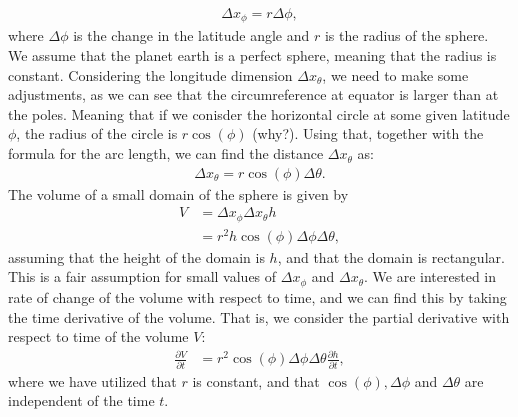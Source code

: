 \begin{align*}
    \Delta x_{\phi} = r \Delta \phi,
\end{align*}
where $\Delta \phi$ is the change in the latitude angle and $r$ is the radius of the sphere.
We assume that the planet earth is a perfect sphere, meaning that the radius is constant.
Considering the longitude dimension $\Delta x_{\theta}$, we need to make some adjustments, as we can see that the circumreference at equator is larger than at the poles.
Meaning that if we conisder the horizontal circle at some given latitude $\phi$, the radius of the circle is $r \cos(\phi)$ (why?).
Using that, together with the formula for the arc length, we can find the distance $\Delta x_{\theta}$ as:
\begin{align*}
    \Delta x_{\theta} = r \cos(\phi) \Delta \theta.
\end{align*}
The volume of a small domain of the sphere is given by 
\begin{align*}
    V &= \Delta x_{\phi} \Delta x_{\theta} h \\
    &= r^2 h \cos(\phi) \Delta \phi \Delta \theta,
\end{align*}
assuming that the height of the domain is $h$, and that the domain is rectangular.
This is a fair assumption for small values of $\Delta x_{\phi}$ and $\Delta x_{\theta}$.
We are interested in rate of change of the volume with respect to time, and we can find this by taking the time derivative of the volume.
That is, we consider the partial derivative with respect to time of the volume $V$:
\begin{align*}
    \frac{\partial V}{\partial t} &= r^2 \cos(\phi) \Delta \phi \Delta \theta \frac{\partial h}{\partial t},
\end{align*}
where we have utilized that $r$ is constant, and that $\cos(\phi), \Delta \phi$ and $\Delta \theta$ are independent of the time $t$.





